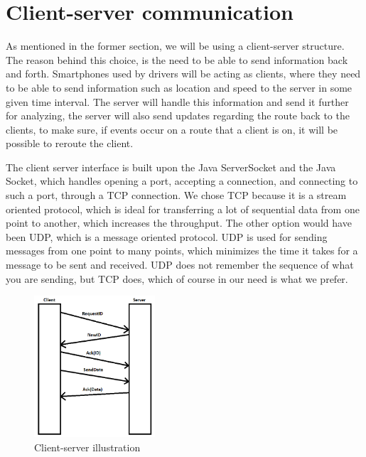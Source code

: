 \section{Client-server communication}
As mentioned in the former section, we will be using a client-server structure.
The reason behind this choice, is the need to be able to send information back and forth.
Smartphones used by drivers will be acting as clients,
where they need to be able to send information such as location and speed to the server in some given time interval.
The server will handle this information and send it further for analyzing,
the server will also send updates regarding the route back to the clients,
to make sure, if events occur on a route that a client is on, it will be possible to reroute the client.

The client server interface is built upon the Java ServerSocket and the Java Socket,
which handles opening a port, accepting a connection, and connecting to such a port, through a TCP connection. 
We chose TCP because it is a stream oriented protocol,
which is ideal for transferring a lot of sequential data from one point to another, which increases the throughput.
The other option would have been UDP, which is a message oriented protocol.
UDP is used for sending messages from one point to many points,
which minimizes the time it takes for a message to be sent and received.
UDP does not remember the sequence of what you are sending, but TCP does, which of course in our need is what we prefer. 

\begin{figure}[h!]
  \centering
    \includegraphics[width=0.4\textwidth]{figures/clientserver.png}
    \caption{Client-server illustration}
    \label{fig:clientserver}
\end{figure}

